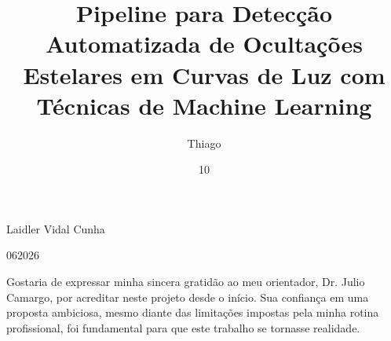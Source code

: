 \documentclass[msc]{on} %
\begin{document}
\title{Pipeline para Detecção Automatizada de Ocultações Estelares em Curvas de Luz com Técnicas de Machine Learning}

\author{Thiago}{Laidler Vidal Cunha}





\date{10}{06}{2026}


\maketitle


\acknowledgments
{}

Gostaria de expressar minha sincera gratidão ao meu orientador, Dr. Julio Camargo, por acreditar neste projeto desde o início. Sua confiança em uma proposta ambiciosa, mesmo diante das limitações impostas pela minha rotina profissional, foi fundamental para que este trabalho se tornasse realidade.
\end{document}

